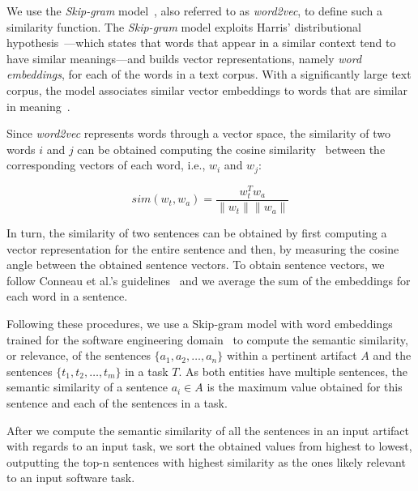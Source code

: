 



We use the \textit{Skip-gram} model~\cite{Mikolov2013}, also referred to as \textit{word2vec}, to define such a similarity function.
The \textit{Skip-gram} model exploits Harris' distributional hypothesis~\cite{harris1954distributional}---which states that words that appear in a similar context tend to have similar meanings---and builds vector representations, namely \textit{word embeddings}, for each of the words in a text corpus.
With a significantly large text corpus, the model associates similar vector embeddings to words that are similar in meaning~\cite{Ye2016}.


Since \textit{word2vec} represents words through a vector space, the similarity of two words $i$ and $j$ can be obtained computing the cosine similarity~\cite{Manning2009IR} between the corresponding vectors of each word, i.e., $w_i$ and $w_j$:

\begin{equation}
    sim(w_t,w_a) = \frac{w_t^Tw_a}{\|w_t\| \|w_a\|}
    \label{eq:word-sim}
\end{equation}
 
\smallskip
In turn, the similarity of two sentences can be obtained by first computing a vector representation for the entire sentence and then, by measuring the cosine angle between the obtained sentence vectors.
To obtain sentence vectors, we follow Conneau et al.'s guidelines~\cite{conneau2018}
and we average the sum of the embeddings for each word in a sentence.




Following these procedures, we use a Skip-gram model with word embeddings trained for the software engineering domain~\cite{Efstathiou2018} to compute the semantic similarity, or relevance, of the sentences $\{a_1, a_2, \dots, a_n\}$ within a pertinent artifact $A$ and the sentences $\{t_1, t_2, \dots, t_m\}$ in a task  $T$. As both entities have multiple sentences, the semantic similarity of a sentence $a_i \in A$ is the maximum value obtained for this sentence and each of the sentences in a task.


After we compute the semantic similarity of all the sentences in an input artifact with regards to an input task, we sort the obtained values from highest to lowest, outputting the top-n sentences with highest similarity as the ones likely relevant to an input software task.


